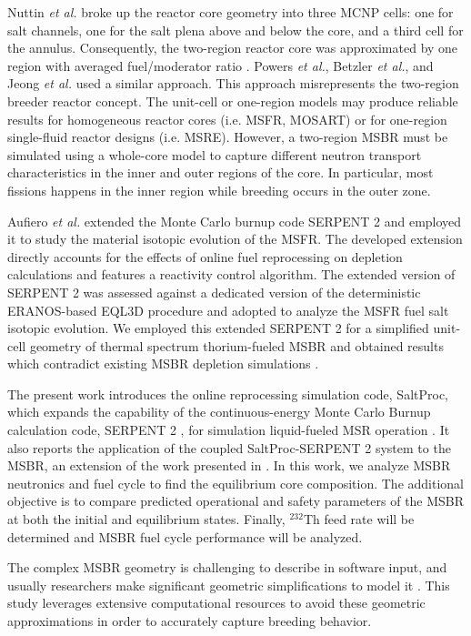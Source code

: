 Nuttin \emph{et al.} broke up the reactor core geometry into three \gls{MCNP} cells: 
one for salt channels, one for the salt plena above and below the core, and a 
third cell for the annulus. Consequently, the two-region reactor core was 
approximated by one region with averaged fuel/moderator ratio 
\cite{nuttin_potential_2005}.  Powers \emph{et 
al.}, Betzler \emph{et al.}, and Jeong \emph{et al.} 
\cite{powers_new_2013,powers_inventory_2014,betzler_modeling_2016, 
betzler_molten_2017, jeong_development_2014, jeong_equilibrium_2016} used a 
similar approach. This approach 
misrepresents the two-region breeder reactor concept. The unit-cell or one-region 
models may produce reliable results for homogeneous reactor cores (i.e. 
\gls{MSFR}, \gls{MOSART}) or for one-region single-fluid reactor designs (i.e. 
\gls{MSRE}). However, a two-region \gls{MSBR} must be simulated using a whole-core 
model to capture different neutron transport characteristics in the inner and 
outer regions of the core. In particular, most fissions happens in the inner 
region while breeding occurs in the outer zone.  

Aufiero \emph{et al.} extended the Monte Carlo burnup code SERPENT 2 and 
employed it to study the material isotopic evolution of the \gls{MSFR}. The 
developed extension directly accounts for the effects of online fuel 
reprocessing on depletion calculations and features a reactivity control 
algorithm. The extended version of SERPENT 2 was assessed against a dedicated 
version of the deterministic ERANOS-based EQL3D procedure 
\cite{ruggieri_eranos_2006} and adopted to analyze the \gls{MSFR} fuel salt 
isotopic evolution. We employed this extended SERPENT 2 for a simplified 
unit-cell geometry of thermal spectrum thorium-fueled \gls{MSBR} and obtained 
results which contradict existing \gls{MSBR} depletion simulations 
\cite{jeong_equilibrium_2016}.

The present work introduces the online reprocessing simulation code, SaltProc, 
which expands the capability of the continuous-energy Monte Carlo Burnup 
calculation code, SERPENT 2 \cite{leppanen_serpent_2015-1}, for simulation 
liquid-fueled \gls{MSR} operation 
\cite{andrei_rykhlevskii_arfc/saltproc:_2018}. It also reports the 
application of the coupled SaltProc-SERPENT 2 system to the \gls{MSBR}, an 
extension of the work presented in 
\cite{rykhlevskii_full-core_2017, rykhlevskii_online_2017}. In this work, we 
analyze \gls{MSBR} neutronics and fuel cycle to find 
the equilibrium core composition. The additional objective 
is to compare predicted operational and safety parameters of the \gls{MSBR} at 
both the initial and equilibrium states. Finally, $^{232}$Th feed rate will be 
determined and \gls{MSBR} fuel cycle performance will be analyzed.

The complex \gls{MSBR} geometry is challenging to describe in software input, 
and usually researchers make significant geometric simplifications to model it 
\cite{park_whole_2015}. This study leverages extensive computational 
resources to avoid these geometric approximations in order to accurately capture 
breeding behavior. 

